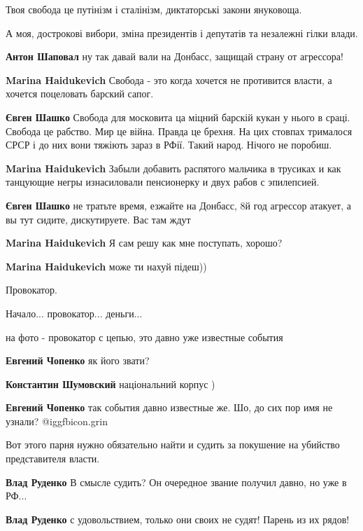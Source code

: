 Твоя свобода це путінізм і сталінізм, диктаторські закони януковоща.

А моя, дострокові вибори, зміна президентів і депутатів та незалежні гілки
влади.

\textbf{Антон Шаповал} ну так давай вали на Донбасс, защищай страну от агрессора!

\textbf{Marina Haidukevich} Свобода - это когда хочется не противится власти, а хочется поцеловать барский сапог.

\textbf{Євген Шашко} Свобода для московита ца міцний барскій кукан у нього в сраці.
Свобода це рабство. Мир це війна. Правда це брехня. На цих стовпах трималося СРСР і до них вони тяжіють зараз в РФії.
Такий народ. Нічого не поробиш.

\textbf{Marina Haidukevich} Забыли добавить распятого мальчика в трусиках и как танцующие негры изнасиловали пенсионерку и двух рабов с эпилепсией.

\textbf{Євген Шашко} не тратьте время, езжайте на Донбасс, 8й год агрессор атакует, а вы тут сидите, дискутируете. Вас там ждут

\textbf{Marina Haidukevich} Я сам решу как мне поступать, хорошо?

\textbf{Marina Haidukevich} може ти нахуй підеш))

Провокатор.

Начало... провокатор... деньги...

на фото - провокатор с цепью, это давно уже известные события

\textbf{Евгений Чопенко} як його звати?

\textbf{Константин Шумовский} національний корпус )

\textbf{Евгений Чопенко} так события давно известные же. Шо, до сих пор имя не узнали? @igg{fbicon.grin} 

Вот этого парня нужно обязательно найти и судить за покушение на убийство представителя власти.

\textbf{Влад Руденко} В смысле судить? Он очередное звание получил давно, но уже в РФ...

\textbf{Влад Руденко} с удовольствием, только они своих не судят! Парень из их рядов!

